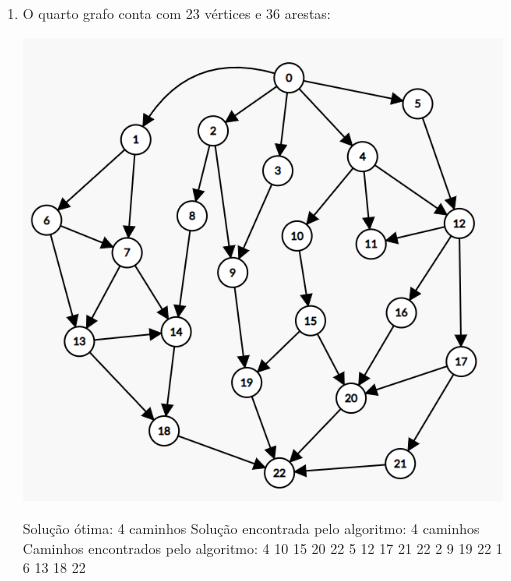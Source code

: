 \begin{enumerate}
    \item O quarto grafo conta com 23 vértices e 36 arestas:
    \begin{center}
        \includegraphics[scale=0.4]{figuras/Grafo4.png}
    \end{center}
    Solução ótima: 4 caminhos\newline
    Solução encontrada pelo algoritmo: 4 caminhos\newline
    Caminhos encontrados pelo algoritmo: 4 10 15 20 22  5 12 17 21 22  2 9 19 22  1 6 13 18 22 \newline
    

\end{enumerate}
